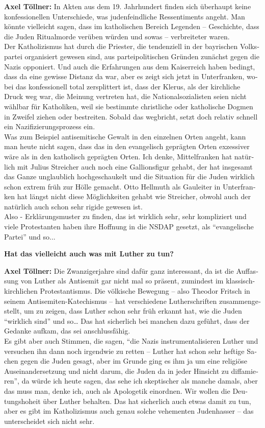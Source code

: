 \begin{otherlanguage}{ngerman}
\textbf{Axel Töllner:} In Akten aus dem 19. Jahrhundert finden sich überhaupt keine konfessionellen Unterschiede, was judenfeindliche Ressentiments angeht. Man könnte vielleicht sagen, dass im katholischen Bereich Legenden – Geschichte, dass die Juden Ritualmorde verüben würden und sowas – verbreiteter waren.\\ 
Der Katholizismus hat durch die Priester, die tendenziell in der bayrischen Volkspartei organisiert gewesen sind, aus parteipolitischen Gründen zunächst gegen die Nazis opponiert. Und auch die Erfahrungen aus dem Kaiserreich haben bedingt, dass da eine gewisse Distanz da war, aber es zeigt sich jetzt in Unterfranken, wobei das konfessionell total zersplittert ist, dass der Klerus, als der kirchliche Druck weg war, die Meinung vertreten hat, die Nationalsozialisten seien nicht wählbar für Katholiken, weil sie bestimmte christliche oder katholische Dogmen in Zweifel ziehen oder bestreiten. Sobald das wegbricht, setzt doch relativ schnell ein Nazifizierungsprozess ein.\\ 
Was zum Beispiel antisemitische Gewalt in den einzelnen Orten angeht, kann man heute nicht sagen, dass das in den evangelisch geprägten Orten exzessiver wäre als in den katholisch geprägten Orten. Ich denke, Mittelfranken hat natürlich mit Julius Streicher auch noch eine Gallionsfigur gehabt, der hat insgesamt das Ganze unglaublich hochgeschaukelt und die Situation für die Juden wirklich schon extrem früh zur Hölle gemacht. Otto Hellmuth als Gauleiter in Unterfranken hat längst nicht diese Möglichkeiten gehabt wie Streicher, obwohl auch der natürlich auch schon sehr rigide gewesen ist.\\  
Also - Erklärungsmuster zu finden, das ist wirklich sehr, sehr kompliziert und viele Protestanten haben ihre Hoffnung in die NSDAP gesetzt, als "`evangelische Partei"' und so... 

\textbf{Hat das vielleicht auch was mit Luther zu tun?} 

\textbf{Axel Töllner:} Die Zwanzigerjahre sind dafür ganz interessant, da ist die Auffassung von Luther als Antisemit gar nicht mal so präsent, zumindest im klassisch-kirchlichen Protestantismus. Die völkische Bewegung – also Theodor Fritsch in seinem Antisemiten-Katechismus – hat verschiedene Lutherschriften zusammengestellt, um zu zeigen, dass Luther schon sehr früh erkannt hat, wie die Juden "`wirklich sind"' und so… Das hat sicherlich bei manchen dazu geführt, dass der Gedanke aufkam, das sei anschlussfähig. \\
Es gibt aber auch Stimmen, die sagen, "`die Nazis instrumentalisieren Luther und versuchen ihn dann noch irgendwie zu retten – Luther hat schon sehr heftige Sachen gegen die Juden gesagt, aber im Grunde ging es ihm ja um eine religiöse Auseinandersetzung und nicht darum, die Juden da in jeder Hinsicht zu diffamieren"', da würde ich heute sagen, das sehe ich skeptischer als manche damals, aber das muss man, denke ich, auch als Apologetik einordnen. Wir wollen die Deutungshoheit über Luther behalten. Das hat sicherlich auch etwas damit zu tun, aber es gibt im Katholizismus auch genau solche vehementen Judenhasser – das unterscheidet sich nicht sehr. 


\end{otherlanguage}
